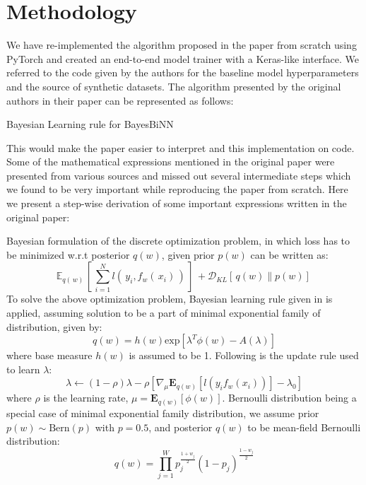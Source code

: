 \section{Methodology}

We have re-implemented the algorithm proposed in the paper from scratch using PyTorch and created an end-to-end model trainer with a Keras-like interface. We referred to the code given by the authors for the baseline model hyperparameters and the source of synthetic datasets. The algorithm presented by the original authors in their paper can be represented as follows:

\begin{algorithm}[H]
\SetAlgoLined
\DontPrintSemicolon

 \;

\caption{Bayesian Learning rule for BayesBiNN}
\label{alg:alg1}
\end{algorithm}

This would make the paper easier to interpret and this implementation on code.
Some of the mathematical expressions mentioned in the original paper were presented from various sources and missed out several intermediate steps which we found to be very important while reproducing the paper from scratch. Here we present a step-wise derivation of some important expressions written in the original paper: 

Bayesian formulation of the discrete optimization problem, in which loss has to be minimized w.r.t posterior $q(w)$, given prior $p(w)$ can be written as: 
\[\mathbb{E}_{q(\,w)\,} [\,\sum\limits_{i=1}^{N}l(\,y_{i}, f_{w}(\,x_{i})\,)\,]\, + \mathcal{D}_{KL}[\,q(w)\|p(w)]\,\]
To solve the above optimization problem, Bayesian learning rule given in \citet{r6} is applied, assuming solution to be a part of minimal exponential family of distribution, given by: \[q(w) = h(w)\text{exp}[\lambda^{T}\phi(w) - A(\lambda)]\]  
where base measure $h(w)$ is assumed to be 1. Following is the update rule used to learn $\lambda$: \[\lambda \leftarrow (1-\rho)\lambda - \rho[\nabla_{\mu}\mathbf{E}_{q(w)}[l(y_{i} f_{w}(x_{i}))]-\lambda_{0}]\] where $\rho$ is the learning rate, $\mu = \mathbf{E}_{q(w)}[\phi(w)]$. Bernoulli distribution being a special case of minimal exponential family distribution, we assume prior $p(w) \sim \mathrm{Bern}(p)$ with $p = 0.5$, and posterior $q(w)$ to be mean-field Bernoulli distribution: \[q(w) = \prod_{j=1}^W p_{j}^{\frac{1+w_{j}}{2}}(1-p_{j})^{\frac{1-w_{j}}{2}} \]   

